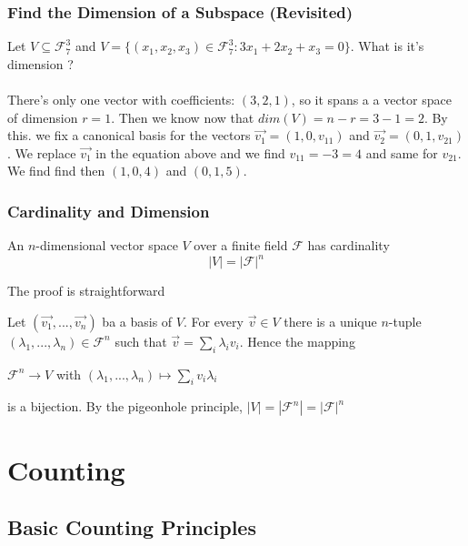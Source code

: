 \documentclass{article}
\begin{document}
\subsubsection{Find the Dimension of a Subspace (Revisited)} Let $ V \subseteq \mathcal{F}_{7}^{3} $ and $ V = \{(x_1,x_2,x_3) \in \mathcal{F}_{7}^{3}: 3x_1 + 2x_2 + x_3 = 0\} $. What is it's dimension ?
\\
\\
There's only one vector with coefficients: $ (3,2,1) $, so it spans a a vector space of dimension $ r = 1 $. Then we know now that $ dim(V) = n - r = 3 - 1 = 2 $. By this. we fix a canonical basis for the vectors $ \vec{v_1} = (1,0,v_{11}) $ and $ \vec{v_2} = (0,1,v_{21}) $. We replace $ \vec{v_1} $ in the equation above and we find $ v_{11} = -3 = 4 $ and same for $ v_{21} $. We find find then $ (1,0,4) $ and $ (0,1,5) $.

\subsubsection{Cardinality and Dimension}
\begin{tcolorbox}[sharp corners, colback=green!30, colframe=green!80!blue, title=Cardinality of a vector space]
An $ n $-dimensional vector space $ V $ over a finite field $ \mathcal{F} $ has cardinality
\begin{equation}
|V| = |\mathcal{F}|^{n}
\end{equation}
\end{tcolorbox}
The proof is straightforward
\begin{tcolorbox}
Let $ (\vec{v_1},...,\vec{v_n}) $ ba a basis of $ V $. For every $ \vec{v} \in V $ there is a unique $ n $-tuple $ (\lambda_1,...,\lambda_n) \in \mathcal{F}^{n} $ such that $ \vec{v} = \sum_{i}\lambda_iv_i $. Hence the mapping
\begin{center}
$ \mathcal{F}^{n} \rightarrow V $ with $ (\lambda_1,...,\lambda_n) \longmapsto \sum_{i}v_i\lambda_i $
\end{center}
is a bijection. By the pigeonhole principle, $ |V| = |\mathcal{F}^n| = |\mathcal{F}|^n $
\end{tcolorbox}

\newpage
\section{Counting}
\subsection{Basic Counting Principles}
\end{document}
